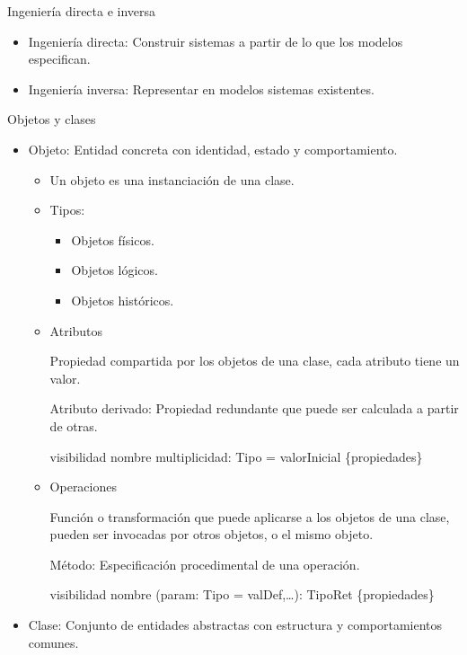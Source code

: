 \documentclass[12pt, twoside, openright]{report} %
\begin{document}
	Ingeniería directa e inversa
\vspace{-0.5cm}
    \begin{itemize}
    
    \item
      Ingeniería directa: Construir sistemas a partir de lo que los
      modelos especifican.
    \item
      Ingeniería inversa: Representar en modelos sistemas existentes.
    \end{itemize}

	Objetos y clases
	\vspace{-0.5cm}

    \begin{itemize}
    \item
      Objeto: Entidad concreta con identidad, estado y comportamiento.

      \begin{itemize}
      \item
        Un objeto es una instanciación de una clase.
      \item
        Tipos:

        \begin{itemize}
        
        \item
          Objetos físicos.
        \item
          Objetos lógicos.
        \item
          Objetos históricos.
        \end{itemize}
      \item
        Atributos

        Propiedad compartida por los objetos de una clase, cada atributo
        tiene un valor.

        Atributo derivado: Propiedad redundante que puede ser calculada
        a partir de otras.

        visibilidad nombre multiplicidad: Tipo = valorInicial
        \{propiedades\}
      \item
        Operaciones

        Función o transformación que puede aplicarse a los objetos de
        una clase, pueden ser invocadas por otros objetos, o el mismo
        objeto.

        Método: Especificación procedimental de una operación.

        visibilidad nombre (param: Tipo = valDef,\ldots): TipoRet
        \{propiedades\}
      \end{itemize}
    \item
      Clase: Conjunto de entidades abstractas con estructura y
      comportamientos comunes.


\end{itemize}
\end{document}
